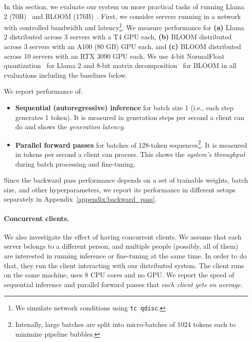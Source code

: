

In this section, we evaluate our system on more practical tasks of running Llama 2 (70B)~\citep{llama2} and BLOOM (176B)~\citep{bloom}.
First, we consider servers running in a network with controlled bandwidth and latency\footnote{We simulate network conditions using \texttt{tc qdisc}.}. We measure performance for \textbf{(a)} Llama 2 distributed across 3 servers with a T4 GPU each, \textbf{(b)} BLOOM distributed across 3 servers with an A100 (80 GB) GPU each, and \textbf{(c)} BLOOM distributed across 10 servers with an RTX 3090 GPU each. We use 4-bit NormalFloat quantization~\citep{dettmers2023qlora} for Llama 2 and 8-bit matrix decomposition~\citep{dettmers2022llm} for BLOOM in all evaluations including the baselines below.

We report performance of:
\begin{itemize}
    \vspace{-2px}
    \item \textbf{Sequential (autoregressive) inference} for batch size 1 (i.e., each step generates 1 token). It is measured in generation steps per second a client can do and shows the \textit{generation latency}.
    \vspace{-2px}
    \item \textbf{Parallel forward passes} for batches of 128-token sequences\footnote{Intenally, large batches are split into micro-batches of 1024 tokens each to minimize pipeline bubbles.}. It is measured in tokens per second a client can process. This shows the \textit{system's throughput} during batch processing and fine-tuning.
    \vspace{-2px}
\end{itemize}

Since the backward pass performance depends on a set of trainable weights, batch size, and other hyperparameters, we report its performance in different setups separately in Appendix~\ref{appendix:backward_pass}.

\paragraph{Concurrent clients.} We also investigate the effect of having concurrent clients. We assume that each server
belongs to a different person, and multiple people (possibly, all of them) are interested in running inference or fine-tuning at the same time. In order to do that, they run the client interacting with our distributed system. The client runs on the same machine, uses 8 CPU cores and no GPU.
We report the speed of sequential inference and parallel forward passes that \textit{each client gets on average.}

